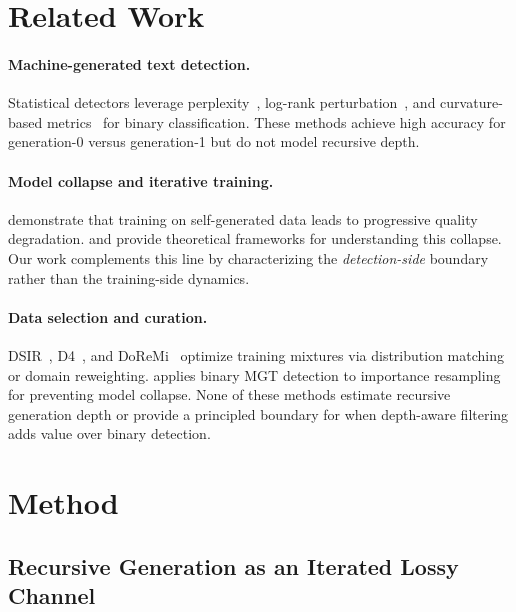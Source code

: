 \documentclass[11pt]{article}
\begin{document}
\section{Related Work}
\label{sec:related}

\paragraph{Machine-generated text detection.}
Statistical detectors leverage perplexity~\citep{solaiman2019release}, log-rank perturbation~\citep{mitchell2023detectgpt}, and curvature-based metrics~\citep{bao2024fastdetectgpt} for binary classification.
These methods achieve high accuracy for generation-0 versus generation-1 but do not model recursive depth.

\paragraph{Model collapse and iterative training.}
\citet{shumailov2024model} demonstrate that training on self-generated data leads to progressive quality degradation.
\citet{alemohammad2024selfconsuming} and \citet{dohmatob2024tale} provide theoretical frameworks for understanding this collapse.
Our work complements this line by characterizing the \emph{detection-side} boundary rather than the training-side dynamics.

\paragraph{Data selection and curation.}
DSIR~\citep{xie2023dsir}, D4~\citep{tirumala2024d4}, and DoReMi~\citep{xie2024doremi} optimize training mixtures via distribution matching or domain reweighting.
\citet{drayson2025contamination} applies binary MGT detection to importance resampling for preventing model collapse.
None of these methods estimate recursive generation depth or provide a principled boundary for when depth-aware filtering adds value over binary detection.

\section{Method}
\label{sec:method}

\subsection{Recursive Generation as an Iterated Lossy Channel}
\label{sec:dpi}
\end{document}

